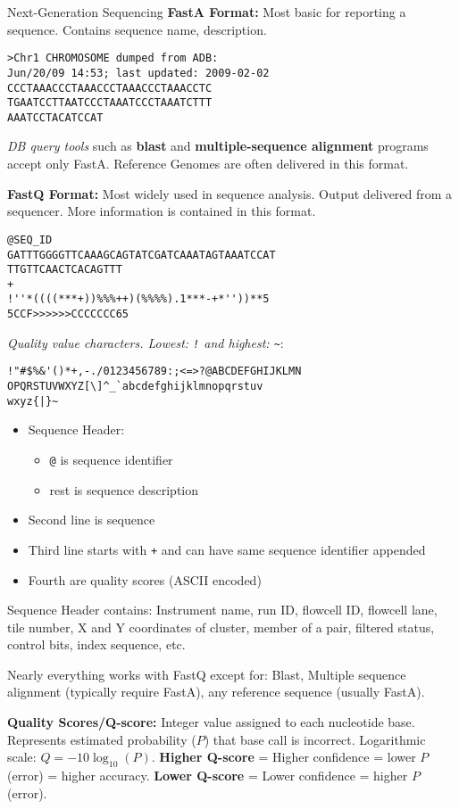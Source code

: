 \documentclass[twocolumn]{article}
\begin{document}
\begin{literaturepaper}{Next-Generation Sequencing \cite{gencore_how_sequencing_works}}
\textbf{FastA Format:} Most basic for reporting a sequence. Contains sequence name, description. 
\begin{verbatim}
>Chr1 CHROMOSOME dumped from ADB: 
Jun/20/09 14:53; last updated: 2009-02-02
CCCTAAACCCTAAACCCTAAACCCTAAACCTC
TGAATCCTTAATCCCTAAATCCCTAAATCTTT
AAATCCTACATCCAT
\end{verbatim}
\textit{DB query tools} such as \textbf{blast} and \textbf{multiple-sequence alignment} programs accept only FastA. Reference Genomes are often delivered in this format.

\textbf{FastQ Format:} Most widely used in sequence analysis. Output delivered from a sequencer. More information is contained in this format.
\begin{verbatim}
@SEQ_ID
GATTTGGGGTTCAAAGCAGTATCGATCAAATAGTAAATCCAT
TTGTTCAACTCACAGTTT
+
!''*((((***+))%%%++)(%%%%).1***-+*''))**5
5CCF>>>>>>CCCCCCC65
\end{verbatim}
\textit{Quality value characters. Lowest: \texttt{!} and highest: \texttt{\textasciitilde{}}}:
\begin{verbatim}
!"#$%&'()*+,-./0123456789:;<=>?@ABCDEFGHIJKLMN
OPQRSTUVWXYZ[\]^_`abcdefghijklmnopqrstuv
wxyz{|}~
\end{verbatim}

\begin{itemize}
    \item Sequence Header:
    \begin{itemize}
        \item \texttt{@} is sequence identifier
        \item rest is sequence description
    \end{itemize}
    \item Second line is sequence
    \item Third line starts with \texttt{+} and can have same sequence identifier appended
    \item Fourth are quality scores (ASCII encoded)
\end{itemize}
Sequence Header contains: Instrument name, run ID, flowcell ID, flowcell lane, tile number, X and Y coordinates of cluster, member of a pair, filtered status, control bits, index sequence, etc.

Nearly everything works with FastQ except for: Blast, Multiple sequence alignment (typically require FastA), any reference sequence (usually FastA).

\textbf{Quality Scores/Q-score:} Integer value assigned to each nucleotide base. Represents estimated probability ($P$) that base call is incorrect. Logarithmic scale: $Q = -10\log_{10}(P)$.
\textbf{Higher Q-score} = Higher confidence = lower $P$ (error) = higher accuracy.
\textbf{Lower Q-score} = Lower confidence = higher $P$ (error).


\end{literaturepaper}
\end{document}
